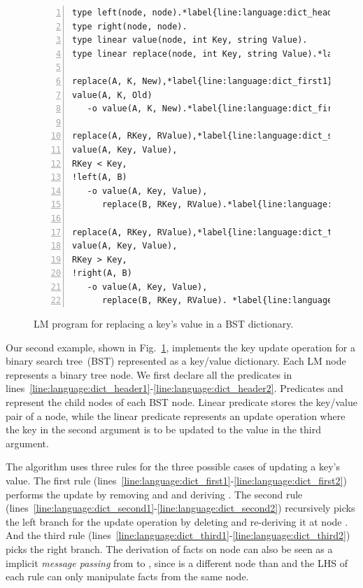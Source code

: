 
\begin{figure}[ht]
\begin{Verbatim}[numbers=left,fontsize=\codesize,commandchars=\*\{\}]
type left(node, node).*label{line:language:dict_header1}*hfill // Predicate declaration
type right(node, node).
type linear value(node, int Key, string Value).
type linear replace(node, int Key, string Value).*label{line:language:dict_header2}

replace(A, K, New),*label{line:language:dict_first1}*hfill// Rule 1: we found our key
value(A, K, Old)
   -o value(A, K, New).*label{line:language:dict_first2}

replace(A, RKey, RValue),*label{line:language:dict_second1}*hfill// Rule 2: go left
value(A, Key, Value),
RKey < Key,
!left(A, B)
   -o value(A, Key, Value),
      replace(B, RKey, RValue).*label{line:language:dict_second2}

replace(A, RKey, RValue),*label{line:language:dict_third1}*hfill// Rule 3: go right
value(A, Key, Value),
RKey > Key,
!right(A, B)
   -o value(A, Key, Value),
      replace(B, RKey, RValue). *label{line:language:dict_third2}
\end{Verbatim}
\caption{LM program for replacing a key's value in a BST dictionary.}
\label{code:language:btree_replace}
\end{figure}

Our second example, shown in Fig.~\ref{code:language:btree_replace}, implements
the key update operation for a binary search tree~(BST) represented as a
key/value dictionary. Each LM node represents a binary tree node. We first
declare all the predicates in
lines~\ref{line:language:dict_header1}-\ref{line:language:dict_header2}.
Predicates  and  represent the child nodes of each BST
node.  Linear predicate  stores the key/value pair of a node, while
the linear predicate  represents an update operation where the key
in the second argument is to be updated to the value in the third argument.

The algorithm uses three rules for the three possible cases of updating a key's
value. The first rule
(lines~\ref{line:language:dict_first1}-\ref{line:language:dict_first2}) performs
the update by removing  and  and
deriving . The second rule
(lines~\ref{line:language:dict_second1}-\ref{line:language:dict_second2})
recursively picks the left branch for the update operation by deleting
 and re-deriving it at node . And the
third rule
(lines~\ref{line:language:dict_third1}-\ref{line:language:dict_third2}) picks
the right branch. The derivation of  facts on node  can
also be seen as a implicit \emph{message passing} from  to ,
since  is a different node than  and the LHS of each rule can
only manipulate facts from the same node.

